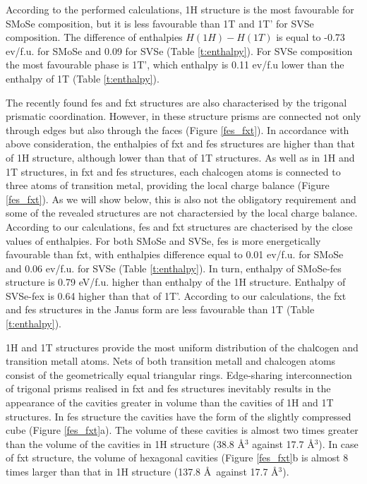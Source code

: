 \documentclass[a4paperm]{article}
\begin{document}
According to the performed calculations, 1H structure is the most favourable for SMoSe composition, but it is less favourable than 1T and 1T' for SVSe composition.
The difference of enthalpies $H(1H)-H(1T)$ is equal to -0.73 ev/f.u. for SMoSe and 0.09 for SVSe (Table \ref{t:enthalpy}).
For SVSe composition the most favourable phase is 1T', which enthalpy is 0.11 ev/f.u lower than the enthalpy of 1T (Table \ref{t:enthalpy}). 

The recently found fes and fxt structures are also characterised by the trigonal prismatic coordination.
However, in these structure prisms are connected not only through edges but also through the faces (Figure \ref{fes_fxt}).
In accordance with above consideration, the enthalpies of fxt and fes structures are higher than that of 1H structure, although lower than that of 1T structures.
As well as in 1H and 1T structures, in fxt and fes structures,  each chalcogen atoms is connected to three atoms of transition metal, providing the local charge balance (Figure \ref{fes_fxt}).
As we will show below, this is also not the obligatory requirement and some of the revealed structures are not charactersied by the local charge balance.
According to our calculations, fes and fxt structures are chacterised by the close values of enthalpies.
For both SMoSe and SVSe, fes is more energetically favourable than fxt, with enthalpies difference equal to 0.01 ev/f.u. for SMoSe and 0.06 ev/f.u. for SVSe (Table \ref{t:enthalpy}).
In turn, enthalpy of SMoSe-fes structure is 0.79 eV/f.u. higher than enthalpy of the 1H structure.
Enthalpy of SVSe-fex is 0.64 higher than that of 1T'.
According to our calculations, the fxt and fes structures in the Janus form are less favourable than 1T (Table \ref{t:enthalpy}).

1H and 1T structures provide the most uniform distribution of the chalсogen and transition metall atoms.
Nets of  both transition metall and chalcogen atoms consist of the geometrically equal triangular rings.
Edge-sharing interconnection of trigonal prisms realised in fxt and fes structures inevitably results in the appearance of the cavities greater in volume than the cavities of 1H and 1T structures. 
In fes structure the cavities have the form of the slightly compressed cube (Figure \ref{fes_fxt}a).
The volume of these cavities is almost two times greater than the volume of the cavities in 1H structure (38.8 \AA$^3$ against 17.7 \AA$^3$).
In case of fxt structure, the volume of hexagonal cavities (Figure \ref{fes_fxt}b is almost 8 times larger than that in 1H structure (137.8 \AA\ against 17.7 \AA$^3$).
\end{document}
